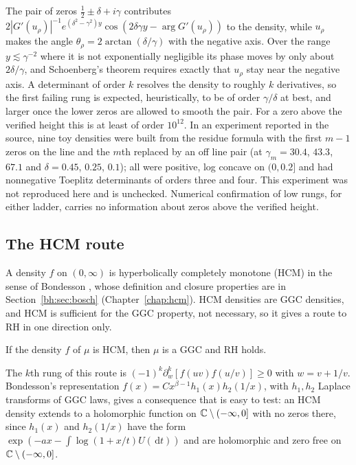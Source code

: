 The pair of zeros $\tfrac12\pm\delta+i\gamma$ contributes $2|G'(u_\rho)|^{-1}e^{(\delta^2-\gamma^2)y}\cos(2\delta\gamma y-\arg G'(u_\rho))$ to the density, while $u_\rho$ makes the angle $\theta_\rho=2\arctan(\delta/\gamma)$ with the negative axis. Over the range $y\lesssim\gamma^{-2}$ where it is not exponentially negligible its phase moves by only about $2\delta/\gamma$, and Schoenberg's theorem requires exactly that $u_\rho$ stay near the negative axis. A determinant of order $k$ resolves the density to roughly $k$ derivatives, so the first failing rung is expected, heuristically, to be of order $\gamma/\delta$ at best, and larger once the lower zeros are allowed to smooth the pair. For a zero above the verified height this is at least of order $10^{12}$. In an experiment reported in the source, nine toy densities were built from the residue formula with the first $m-1$ zeros on the line and the $m$th replaced by an off line pair (at $\gamma_m=30.4$, $43.3$, $67.1$ and $\delta=0.45$, $0.25$, $0.1$); all were positive, log concave on $(0,0.2]$ and had nonnegative Toeplitz determinants of orders three and four. This experiment was not reproduced here and is unchecked. Numerical confirmation of low rungs, for either ladder, carries no information about zeros above the verified height.

\subsection{The HCM route}

A density $f$ on $(0,\infty)$ is hyperbolically completely monotone (HCM) in the sense of Bondesson \cite{Bondesson}, whose definition and closure properties are in Section~\ref{bh:sec:bosch} (Chapter~\ref{chap:hcm}). HCM densities are GGC densities, and HCM is sufficient for the GGC property, not necessary, so it gives a route to RH in one direction only.

\begin{proposition}\label{ht:prop:hcm}
If the density $f$ of $\mu$ is HCM, then $\mu$ is a GGC and RH holds.
\end{proposition}

The $k$th rung of this route is $(-1)^k\partial_w^k[f(uv)f(u/v)]\ge0$ with $w=v+1/v$. Bondesson's representation $f(x)=Cx^{\beta-1}h_1(x)h_2(1/x)$, with $h_1,h_2$ Laplace transforms of GGC laws, gives a consequence that is easy to test: an HCM density extends to a holomorphic function on $\mathbb{C}\setminus(-\infty,0]$ with no zeros there, since $h_1(x)$ and $h_2(1/x)$ have the form $\exp(-ax-\int\log(1+x/t)U(\,\mathrm{d}t))$ and are holomorphic and zero free on $\mathbb{C}\setminus(-\infty,0]$.

